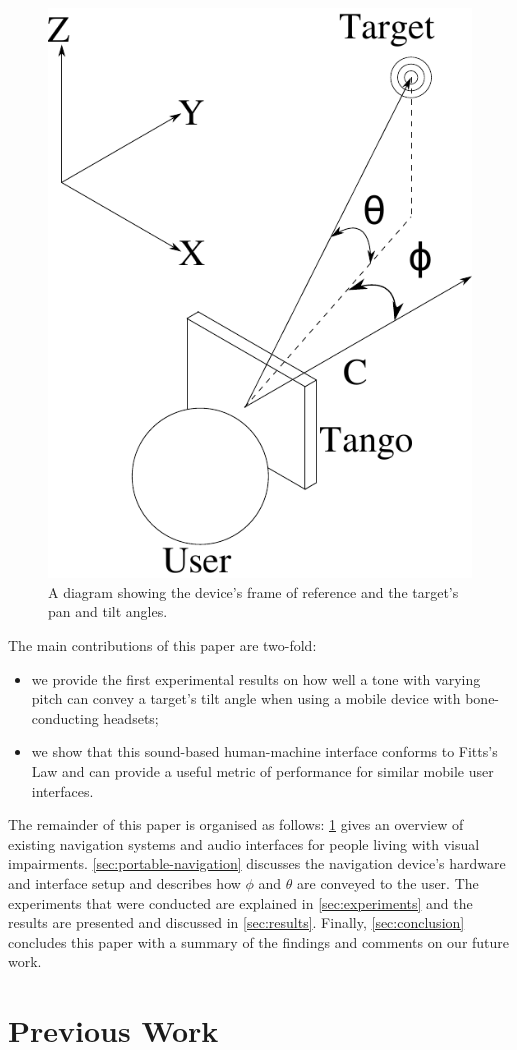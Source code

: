 \documentclass[sigconf, screen=true, anonymous=true]{acmart}
\begin{document}
\begin{figure}
  \centering
  \includegraphics[width=0.4\columnwidth]{figures/camera_coordinate.pdf}
  \caption{A diagram showing the device's frame of reference and the target's pan and tilt angles.}\label{fig:cam-coords}
\end{figure}

The main contributions of this paper are two-fold: 

\begin{itemize}
  \item we provide the first experimental results on how well a tone with varying pitch can convey a target's tilt angle when using a mobile device with bone-conducting headsets; 
  \item we show that this sound-based human-machine interface conforms to Fitts's Law and can provide a useful metric of performance for similar mobile user interfaces.
\end{itemize}

The remainder of this paper is organised as follows: \cref{sec:lit-review} gives an overview of existing navigation systems and audio interfaces for people living with visual impairments.
\cref{sec:portable-navigation} discusses the navigation device's hardware and interface setup and describes how $\phi$ and $\theta$ are conveyed to the user.
The experiments that were conducted are explained in \cref{sec:experiments} and the results are presented and discussed in \cref{sec:results}. 
Finally, \cref{sec:conclusion} concludes this paper with a summary of the findings and comments on our future work. 

\section{Previous Work}\label{sec:lit-review}
\end{document}
